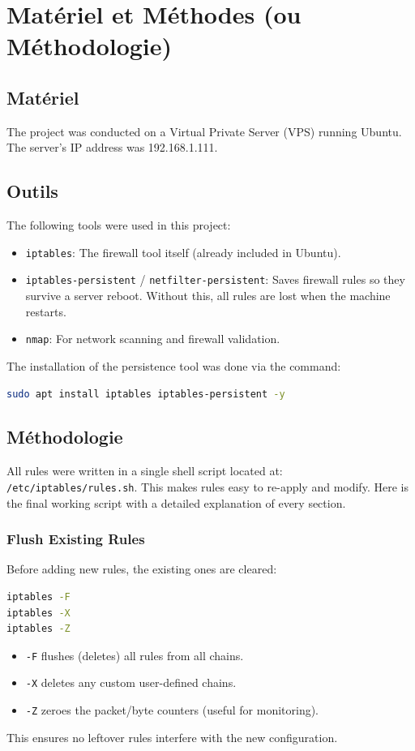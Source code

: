 \chapter{Matériel et Méthodes (ou Méthodologie)}
\section{Matériel}
The project was conducted on a Virtual Private Server (VPS) running Ubuntu. The server's IP address was 192.168.1.111.

\section{Outils}
The following tools were used in this project:
\begin{itemize}
    \item \texttt{iptables}: The firewall tool itself (already included in Ubuntu).
    \item \texttt{iptables-persistent} / \texttt{netfilter-persistent}: Saves firewall rules so they survive a server reboot. Without this, all rules are lost when the machine restarts.
    \item \texttt{nmap}: For network scanning and firewall validation.
\end{itemize}
The installation of the persistence tool was done via the command:
\begin{lstlisting}[language=bash]
sudo apt install iptables iptables-persistent -y
\end{lstlisting}

\section{Méthodologie}
All rules were written in a single shell script located at: \texttt{/etc/iptables/rules.sh}. This makes rules easy to re-apply and modify. Here is the final working script with a detailed explanation of every section.

\subsection{Flush Existing Rules}
Before adding new rules, the existing ones are cleared:
\begin{lstlisting}[language=bash]
iptables -F
iptables -X
iptables -Z
\end{lstlisting}
\begin{itemize}
    \item \texttt{-F} flushes (deletes) all rules from all chains.
    \item \texttt{-X} deletes any custom user-defined chains.
    \item \texttt{-Z} zeroes the packet/byte counters (useful for monitoring).
\end{itemize}
This ensures no leftover rules interfere with the new configuration.

